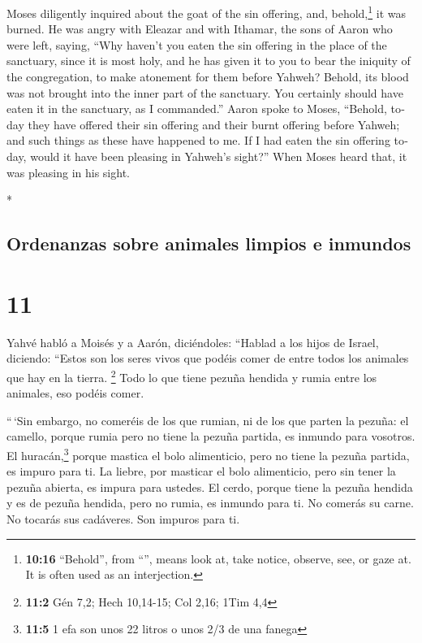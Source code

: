 \begin{paracol}{2}
\begin{otherlanguage}{english}
 Moses diligently inquired about the goat of the sin
offering, and, behold,\footnote{\textbf{10:16} ``Behold'', from
  ``'', means look at, take notice, observe, see, or gaze
  at. It is often used as an interjection.} it was burned. He was angry
with Eleazar and with Ithamar, the sons of Aaron who were left, saying,
 ``Why haven't you eaten the sin offering in the place of
the sanctuary, since it is most holy, and he has given it to you to bear
the iniquity of the congregation, to make atonement for them before
Yahweh?  Behold, its blood was not brought into the inner
part of the sanctuary. You certainly should have eaten it in the
sanctuary, as I commanded.''  Aaron spoke to Moses,
``Behold, today they have offered their sin offering and their burnt
offering before Yahweh; and such things as these have happened to me. If
I had eaten the sin offering today, would it have been pleasing in
Yahweh's sight?''  When Moses heard that, it was pleasing
in his sight.

\end{otherlanguage}

\switchcolumn[0]*

\hypertarget{ordenanzas-sobre-animales-limpios-e-inmundos}{%
\subsection{Ordenanzas sobre animales limpios e
inmundos}\label{ordenanzas-sobre-animales-limpios-e-inmundos}}

\hypertarget{section-20}{%
\section{11}\label{section-20}}

 Yahvé habló a Moisés y a Aarón, diciéndoles:
 ``Hablad a los hijos de Israel, diciendo: ``Estos son los
seres vivos que podéis comer de entre todos los animales que hay en la
tierra. \footnote{\textbf{11:2} Gén 7,2; Hech 10,14-15; Col 2,16; 1Tim
  4,4}  Todo lo que tiene pezuña hendida y rumia entre los
animales, eso podéis comer.

 ``\,`Sin embargo, no comeréis de los que rumian, ni de
los que parten la pezuña: el camello, porque rumia pero no tiene la
pezuña partida, es inmundo para vosotros.  El
huracán,\footnote{\textbf{11:5} 1 efa son unos 22 litros o unos 2/3 de
  una fanega} porque mastica el bolo alimenticio, pero no tiene la
pezuña partida, es impuro para ti.  La liebre, por
masticar el bolo alimenticio, pero sin tener la pezuña abierta, es
impura para ustedes.  El cerdo, porque tiene la pezuña
hendida y es de pezuña hendida, pero no rumia, es inmundo para ti.
 No comerás su carne. No tocarás sus cadáveres. Son
impuros para ti.


\end{paracol}
